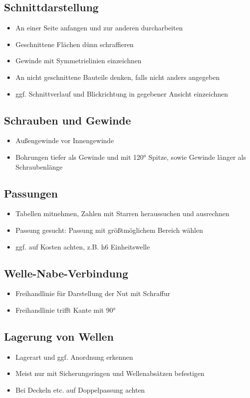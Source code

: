 \documentclass[a4paper,parskip=half*,DIV=7,fontsize=11pt]{scrartcl}
\begin{document}
\subsection{Schnittdarstellung}
\begin{itemize}
	\item An einer Seite anfangen und zur anderen durcharbeiten
	\item Geschnittene Flächen dünn schraffieren
	\item Gewinde mit Symmetrielinien einzeichnen
	\item An nicht geschnittene Bauteile denken, falls nicht anders angegeben
	\item ggf. Schnittverlauf und Blickrichtung in gegebener Ansicht einzeichnen
\end{itemize}

\subsection{Schrauben und Gewinde}
\begin{itemize}
	\item Außengewinde vor Innengewinde
	\item Bohrungen tiefer als Gewinde und mit 120° Spitze, sowie Gewinde länger als Schraubenlänge
\end{itemize}

\subsection{Passungen}
\begin{itemize}
	\item Tabellen mitnehmen, Zahlen mit Starren heraussuchen und ausrechnen
	\item Passung gesucht: Passung mit größtmöglichem Bereich wählen
	\item ggf. auf Kosten achten, z.B. h6 Einheitswelle
\end{itemize}

\subsection{Welle-Nabe-Verbindung}
\begin{itemize}
	\item Freihandlinie für Darstellung der Nut mit Schraffur
	\item Freihandlinie trifft Kante mit 90°
\end{itemize}

\subsection{Lagerung von Wellen}
\begin{itemize}
	\item Lagerart und ggf. Anordnung erkennen
	\item Meist nur mit Sicherungsringen und Wellenabsätzen befestigen
	\item Bei Deckeln etc. auf Doppelpassung achten
\end{itemize}
\end{document}
